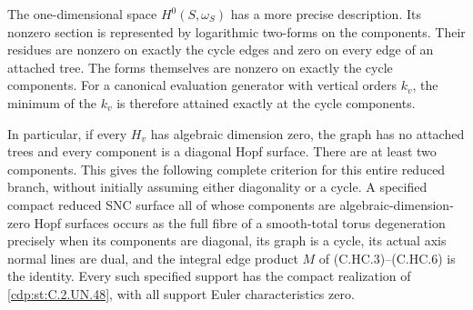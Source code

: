 \begin{proposition}
The one-dimensional space $H^0(S,\omega_S)$ has a more precise
description. Its nonzero section is represented by logarithmic
two-forms on the components. Their residues are nonzero on exactly
the cycle edges and zero on every edge of an attached tree. The
forms themselves are nonzero on exactly the cycle components.
For a canonical evaluation generator with vertical orders $k_v$,
the minimum of the $k_v$ is therefore attained exactly at the
cycle components.

In particular, if every $H_v$ has algebraic dimension zero, the
graph has no attached trees and every component is a diagonal Hopf
surface. There are at least two components. This gives the following
complete criterion for this entire reduced branch, without initially
assuming either diagonality or a cycle. A specified compact reduced
SNC surface all of whose components are algebraic-dimension-zero
Hopf surfaces occurs as the full fibre of a smooth-total torus
degeneration precisely when its components are diagonal, its graph
is a cycle, its actual axis normal lines are dual, and the integral
edge product $M$ of (C.HC.3)--(C.HC.6) is the identity. Every such
specified support has the compact realization of \ref{cdp:st:C.2.UN.48}, with
all support Euler characteristics zero.
\end{proposition}

